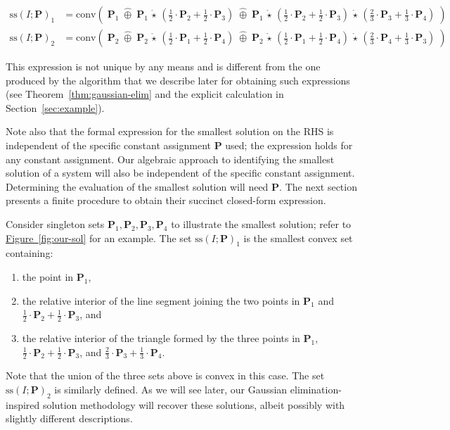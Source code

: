 \documentclass[10pt]{amsart}
\theoremstyle{plain}
\theoremstyle{definition}
\providecommand{\namedref}[2]{\hyperref[#2]{#1~\ref*{#2}}\xspace}
\providecommand{\figureref}[1]{\namedref{Figure}{fig:#1}}
\providecommand{\bP}[0]{\ensuremath{\mathbf P}\xspace}
\providecommand{\cplus}[0]{\ensuremath{\hat{\oplus}}\xspace}
\providecommand{\cmult}[0]{\ensuremath{{\,\mathring{\star}\,}}\xspace}
\providecommand{\conv}[1]{\ensuremath{\mathrm{conv}{\left({#1}\right)}\xspace}}
\providecommand{\ssol}{\ensuremath{\mathrm{ss}}\xspace}
\begin{document}
\begin{align}
\label{eqn:example:ss:1}
    \ssol(I;\bP)_1 &= \conv{ \;  
                            \bP_1  
                            \;\cplus\; \bP_1\cmult\left(\frac12\cdot \bP_2 + \frac12\cdot\bP_3\right) 
                            \;\cplus\; \bP_1\cmult\left(\frac12\cdot \bP_2 + \frac12\cdot\bP_3\right) \cmult \left(\frac23\cdot \bP_3+ \frac13\cdot \bP_4\right)
                        \;}\\
    \label{eqn:example:ss:2}
    \ssol(I;\bP)_2 &= \conv{ \;  
                            \bP_2  
                            \;\cplus\; \bP_2\cmult\left(\frac12\cdot \bP_1 + \frac12\cdot\bP_4\right) 
                            \;\cplus\; \bP_2\cmult\left(\frac12\cdot \bP_1 + \frac12\cdot\bP_4\right) \cmult \left(\frac23\cdot \bP_4+ \frac13\cdot \bP_3\right)
                        \;}
\end{align}


This expression is not unique by any means and is different from
the one produced by the algorithm that we describe later for obtaining such expressions (see Theorem~\ref{thm:gaussian-elim} and the explicit calculation in Section~\ref{sec:example}).

Note also that the formal expression for the smallest solution on the RHS is independent of the specific constant assignment $\bP$ used; the expression holds for any constant assignment. 
Our algebraic approach to identifying the smallest solution of a system will also be independent of the specific constant assignment.
Determining the evaluation of the smallest solution will need $\bP$. 
The next section presents a finite procedure to obtain their succinct closed-form expression. 



Consider singleton sets $\bP_1, \bP_2, \bP_3, \bP_4$ to illustrate the smallest solution; refer to \figureref{our-sol} for an example. 
The set $\ssol(I;\bP)_1$ is the smallest convex set containing:
\begin{enumerate}%
    \item the point in $\bP_1$, 
    \item the relative interior of the line segment joining the two points in $\bP_1$ and $\frac12\cdot \bP_2 + \frac12\cdot\bP_3$, and 
    \item the relative interior of the triangle formed by the three points in $\bP_1$, $\frac12\cdot \bP_2 + \frac12\cdot\bP_3$, and $\frac23\cdot \bP_3+ \frac13\cdot \bP_4$.
\end{enumerate}
Note that the union of the three sets above is convex in this case. 
The set $\ssol(I;\bP)_2$ is similarly defined. 
As we will see later, our Gaussian elimination-inspired solution methodology will recover these solutions, albeit possibly with slightly different descriptions. 
\end{document}
